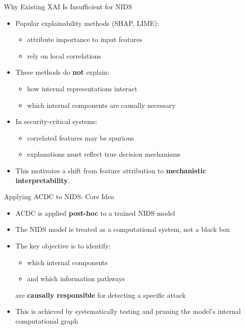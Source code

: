 \documentclass{beamer}
\begin{document}
	\begin{frame}{Why Existing XAI Is Insufficient for NIDS}
		\begin{itemize}
			\item Popular explainability methods (SHAP, LIME):
			\begin{itemize}
				\item attribute importance to input features
				\item rely on local correlations
			\end{itemize}
			\item These methods do \textbf{not} explain:
			\begin{itemize}
				\item how internal representations interact
				\item which internal components are causally necessary
			\end{itemize}
			\item In security-critical systems:
			\begin{itemize}
				\item correlated features may be spurious
				\item explanations must reflect true decision mechanisms
			\end{itemize}
			\item This motivates a shift from feature attribution to
			\textbf{mechanistic interpretability}.
		\end{itemize}
	\end{frame}
	
	\begin{frame}{Applying ACDC to NIDS: Core Idea}
		\begin{itemize}
			\item ACDC is applied \textbf{post-hoc} to a trained NIDS model
			\item The NIDS model is treated as a computational system, not a black box
			\item The key objective is to identify:
			\begin{itemize}
				\item which internal components
				\item and which information pathways
			\end{itemize}
			are \textbf{causally responsible} for detecting a specific attack
			\item This is achieved by systematically testing and pruning the model’s
			internal computational graph
		\end{itemize}
	\end{frame}
	
\end{document}
